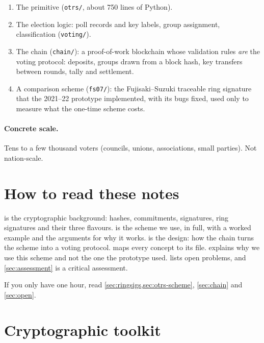 \documentclass[11pt,a4paper]{article}
\newcommand{\file}[1]{\texttt{#1}}
\theoremstyle{definition}
\begin{document}
\begin{enumerate}[leftmargin=*]
  \item The primitive (\file{otrs/}, about 750 lines of Python).
  \item The election logic: poll records and key labels, group assignment,
    classification (\file{voting/}).
  \item The chain (\file{chain/}): a proof-of-work blockchain whose
    validation rules \emph{are} the voting protocol: deposits, groups drawn
    from a block hash, key transfers between rounds, tally and settlement.
  \item A comparison scheme (\file{fs07/}): the Fujisaki--Suzuki traceable
    ring signature~\cite{FS07} that the 2021--22 prototype implemented, with
    its bugs fixed, used only to measure what the one-time scheme costs.
\end{enumerate}

\paragraph{Concrete scale.} Tens to a few thousand voters (councils,
unions, associations, small parties). Not nation-scale.

\section{How to read these notes}

 is the cryptographic background: hashes, commitments,
signatures, ring signatures and their three flavours.  is
the scheme we use, in full, with a worked example and the arguments for
why it works.  is the design: how the chain turns the
scheme into a voting protocol.  maps every concept to its
file.  explains why we use this scheme and not the one the
prototype used.  lists open problems, and
\cref{sec:assessment} is a critical assessment.

If you only have one hour, read \cref{sec:ringsigs,sec:otrs-scheme},
\cref{sec:chain} and \cref{sec:open}.

\section{Cryptographic toolkit}
\label{sec:toolkit}
\end{document}
